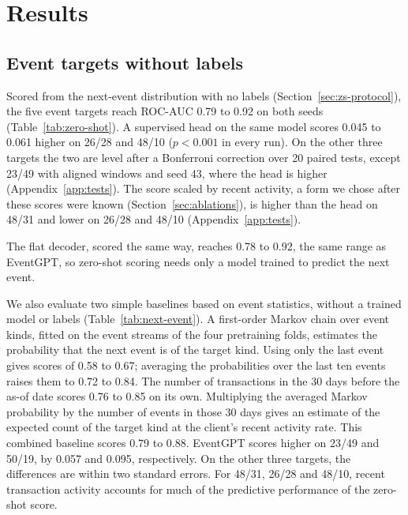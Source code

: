 \documentclass[12pt]{article}
\begin{document}
\section{Results}\label{sec:results}

\subsection{Event targets without labels}\label{sec:zero-shot}

Scored from the next-event distribution with no labels (Section~\ref{sec:zs-protocol}), the five event targets reach ROC-AUC 0.79 to 0.92 on both seeds (Table~\ref{tab:zero-shot}). A supervised head on the same model scores 0.045 to 0.061 higher on 26/28 and 48/10 ($p < 0.001$ in every run). On the other three targets the two are level after a Bonferroni correction over 20 paired tests, except 23/49 with aligned windows and seed 43, where the head is higher (Appendix~\ref{app:tests}). The score scaled by recent activity, a form we chose after these scores were known (Section~\ref{sec:ablations}), is higher than the head on 48/31 and lower on 26/28 and 48/10 (Appendix~\ref{app:tests}).

The flat decoder, scored the same way, reaches 0.78 to 0.92, the same range as EventGPT, so zero-shot scoring needs only a model trained to predict the next event.

We also evaluate two simple baselines based on event statistics, without a trained model or labels (Table~\ref{tab:next-event}). A first-order Markov chain over event kinds, fitted on the event streams of the four pretraining folds, estimates the probability that the next event is of the target kind. Using only the last event gives scores of 0.58 to 0.67; averaging the probabilities over the last ten events raises them to 0.72 to 0.84. The number of transactions in the 30 days before the as-of date scores 0.76 to 0.85 on its own. Multiplying the averaged Markov probability by the number of events in those 30 days gives an estimate of the expected count of the target kind at the client's recent activity rate. This combined baseline scores 0.79 to 0.88. EventGPT scores higher on 23/49 and 50/19, by 0.057 and 0.095, respectively. On the other three targets, the differences are within two standard errors. For 48/31, 26/28 and 48/10, recent transaction activity accounts for much of the predictive performance of the zero-shot score.
\end{document}
